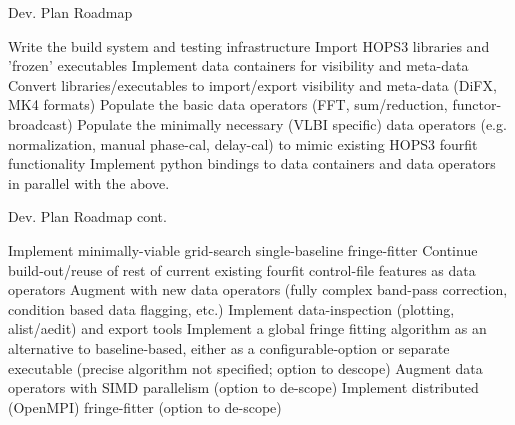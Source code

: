 \documentclass[8pt]{beamer}
\begin{document}
\begin{frame}{Dev. Plan Roadmap}


    \begin{outline}
    \1 Write the build system and testing infrastructure
    \1 Import HOPS3 libraries and 'frozen' executables
    \1 Implement data containers for visibility and meta-data
    \1 Convert libraries/executables to import/export visibility and meta-data (DiFX, MK4 formats)
    \1 Populate the basic data operators (FFT, sum/reduction, functor-broadcast)
    \1 Populate the minimally necessary (VLBI specific) data operators (e.g. normalization, manual phase-cal, delay-cal) to mimic existing HOPS3 fourfit functionality
    \1 Implement python bindings to data containers and data operators in parallel with the above.
    \end{outline}
\end{frame}

\begin{frame}{Dev. Plan Roadmap cont.}


\begin{outline}
    \1 Implement minimally-viable grid-search single-baseline fringe-fitter 
    \1 Continue build-out/reuse of rest of current existing fourfit control-file features as data operators
    \1 Augment with new data operators (fully complex band-pass correction, condition based data flagging, etc.)
    \1 Implement data-inspection (plotting, alist/aedit) and export tools
    \1 Implement a global fringe fitting algorithm as an alternative to baseline-based, either as a configurable-option or separate executable (precise algorithm not specified; option to descope)
    \1 Augment data operators with SIMD parallelism (option to de-scope)
    \1 Implement distributed (OpenMPI) fringe-fitter (option to de-scope)
    \end{outline}
\end{frame}
\end{document}
